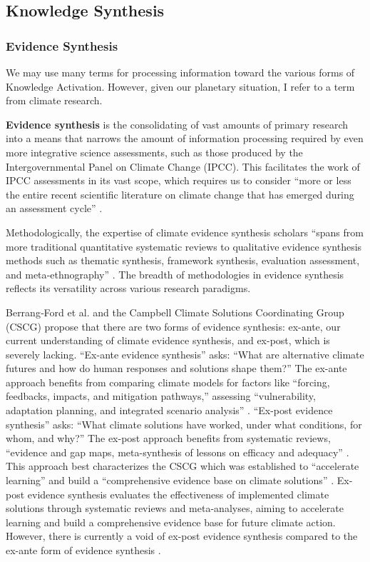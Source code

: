 \subsection{Knowledge Synthesis}
\subsubsection{Evidence Synthesis}
We may use many terms for processing information toward the various forms of Knowledge Activation. However, given our planetary situation, I refer to a term from climate research.

\textbf{Evidence synthesis} is the consolidating of vast amounts of primary research into a means that narrows the amount of information processing required by even more integrative science assessments, such as those produced by the Intergovernmental Panel on Climate Change (IPCC). This facilitates the work of IPCC assessments in its vast scope, which requires us to consider “more or less the entire recent scientific literature on climate change that has emerged during an assessment cycle” \citep[p. 1]{berrangford_editorial_2020}.

Methodologically, the expertise of climate evidence synthesis scholars “spans from more traditional quantitative systematic reviews to qualitative evidence synthesis methods such as thematic synthesis, framework synthesis, evaluation assessment, and meta‐ethnography” \citep[p. 2-3]{berrangford_editorial_2020}. The breadth of methodologies in evidence synthesis reflects its versatility across various research paradigms.

Berrang‐Ford et al. and the Campbell Climate Solutions Coordinating Group (CSCG) propose that there are two forms of evidence synthesis: ex-ante, our current understanding of climate evidence synthesis, and ex-post, which is severely lacking. “Ex-ante evidence synthesis” asks: “What are alternative climate futures and how do human responses and solutions shape them?” The ex-ante approach benefits from comparing climate models for factors like “forcing, feedbacks, impacts, and mitigation pathways,” assessing “vulnerability, adaptation planning, and integrated scenario analysis” \citep[p. 2]{berrangford_editorial_2020}. “Ex-post evidence synthesis” asks: “What climate solutions have worked, under what conditions, for whom, and why?” The ex-post approach benefits from systematic reviews, “evidence and gap maps, meta-synthesis of lessons on efficacy and adequacy” \citep[p. 2]{berrangford_editorial_2020}. This approach best characterizes the CSCG which was established to “accelerate learning” and build a “comprehensive evidence base on climate solutions” \citep[p. 2]{berrangford_editorial_2020}. Ex-post evidence synthesis evaluates the effectiveness of implemented climate solutions through systematic reviews and meta-analyses, aiming to accelerate learning and build a comprehensive evidence base for future climate action. However, there is currently a void of ex-post evidence synthesis compared to the ex-ante form of evidence synthesis \citep[p. 2]{berrangford_editorial_2020}. 

